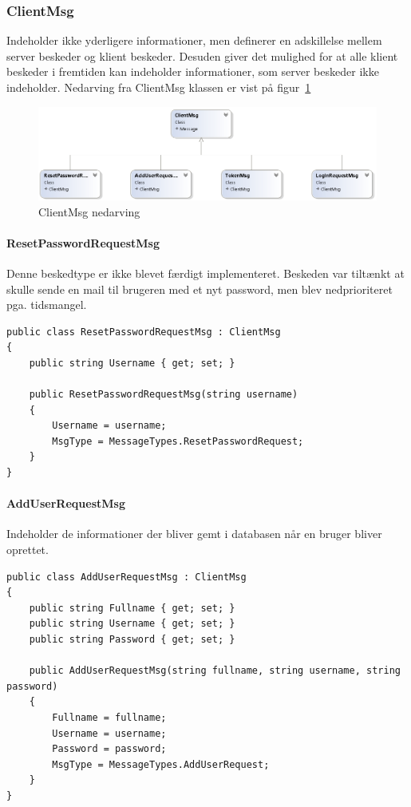 \subsubsection{ClientMsg}
Indeholder ikke yderligere informationer, men definerer en adskillelse mellem server beskeder og klient beskeder. Desuden giver det mulighed for at alle klient beskeder i fremtiden kan indeholder informationer, som server beskeder ikke indeholder. Nedarving fra ClientMsg klassen er vist på figur~\ref{fig:ClientMsgUML}

\begin{figure}
	\centering
	\includegraphics[width=0.7\linewidth]{figs/connection/ClientMsgUML.png}
	\caption{ClientMsg nedarving}
	\label{fig:ClientMsgUML}
\end{figure}

\paragraph{ResetPasswordRequestMsg}
Denne beskedtype er ikke blevet færdigt implementeret. Beskeden var tiltænkt at skulle sende en mail til brugeren med et nyt password, men blev nedprioriteret pga. tidsmangel.
\begin{lstlisting}[caption=ResetPasswordRequestMsg, label=code:ResetPasswordRequestMsg]
public class ResetPasswordRequestMsg : ClientMsg
{
	public string Username { get; set; }
	
	public ResetPasswordRequestMsg(string username)
	{
		Username = username;
		MsgType = MessageTypes.ResetPasswordRequest;
	}
}
\end{lstlisting}

\paragraph{AddUserRequestMsg}
Indeholder de informationer der bliver gemt i databasen når en bruger bliver oprettet.
\begin{lstlisting}[caption=AddUserRequestMsg, label=code:AddUserRequestMsg]
public class AddUserRequestMsg : ClientMsg
{
	public string Fullname { get; set; }
	public string Username { get; set; }
	public string Password { get; set; }
	
	public AddUserRequestMsg(string fullname, string username, string password)
	{
		Fullname = fullname;
		Username = username;
		Password = password;
		MsgType = MessageTypes.AddUserRequest;
	}
}
\end{lstlisting}

